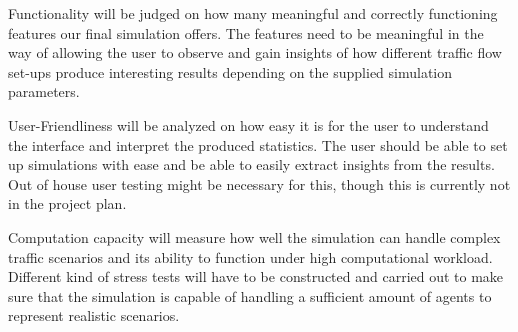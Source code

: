 Functionality will be judged on how many meaningful and correctly functioning features our final simulation offers. The features need to be meaningful in the way of allowing the user to observe and gain insights of how different traffic flow set-ups produce interesting results depending on the supplied simulation parameters.

User-Friendliness will be analyzed on how easy it is for the user to understand the interface and interpret the produced statistics. The user should be able to set up simulations with ease and be able to easily extract insights from the results. Out of house user testing might be necessary for this, though this is currently not in the project plan. 

Computation capacity will measure how well the simulation can handle complex traffic scenarios and its ability to function under high computational workload. Different kind of stress tests will have to be constructed and carried out to make sure that the simulation is capable of handling a sufficient amount of agents to represent realistic scenarios. 

